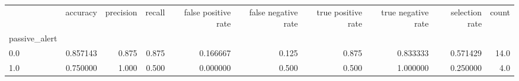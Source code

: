 \begin{tabular}{lrrrrrrrrr}
\toprule
{} &  accuracy &  precision &  recall &  false positive rate &  false negative rate &  true positive rate &  true negative rate &  selection rate &  count \\
passive\_alert &           &            &         &                      &                      &                     &                     &                 &        \\
\midrule
0.0           &  0.857143 &      0.875 &   0.875 &             0.166667 &                0.125 &               0.875 &            0.833333 &        0.571429 &   14.0 \\
1.0           &  0.750000 &      1.000 &   0.500 &             0.000000 &                0.500 &               0.500 &            1.000000 &        0.250000 &    4.0 \\
\bottomrule
\end{tabular}

